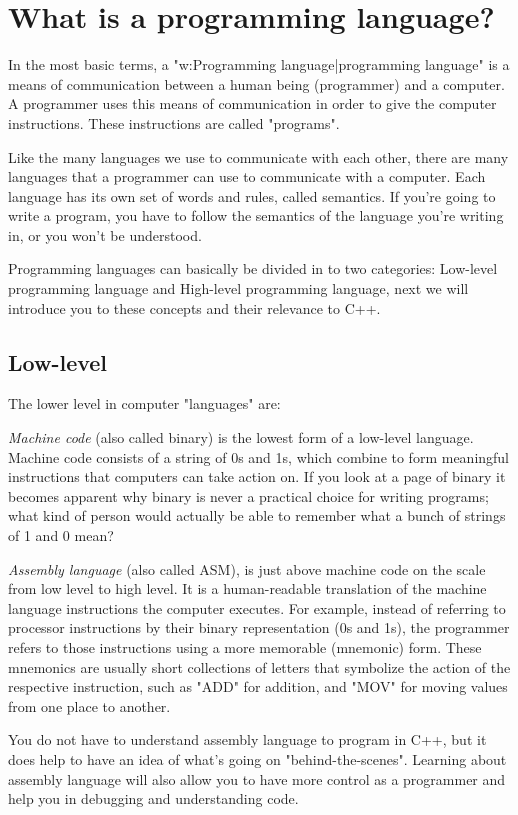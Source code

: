 \section{What is a programming language?}
In the most basic terms, a "w:Programming language|programming language" is a
means of communication between a human being (programmer) and a computer. A
programmer uses this means of communication in order to give the computer
instructions.  These instructions are called "programs".

Like the many languages we use to communicate with each other, there are many
languages that a programmer can use to communicate with a computer.  Each
language has its own set of words and rules, called semantics.  If you're going
to write a program, you have to follow the semantics of the language you're
writing in, or you won't be understood.

Programming languages can basically be divided in to two categories: Low-level
programming language and High-level programming language, next we will
introduce you to these concepts and their relevance to C++.

\subsection{Low-level}
The lower level in computer "languages" are: 

\textit{Machine code} (also called binary) is the lowest form of a low-level
language. Machine code consists of a string of 0s and 1s, which combine to form
meaningful instructions that computers can take action on. If you look at a
page of binary it becomes apparent why binary is never a practical choice for
writing programs; what kind of person would actually be able to remember what a
bunch of strings of 1 and 0 mean? 

\textit{Assembly language} (also called ASM), is just above machine code on
the scale from low level to high level. It is a human-readable translation of
the machine language instructions the computer executes.  For example, instead
of referring to processor instructions by their binary representation (0s and
1s), the programmer refers to those instructions using a more memorable
(mnemonic) form. These mnemonics are usually short collections of letters that
symbolize the action of the respective instruction, such as "ADD" for addition,
and "MOV" for moving values from one place to another.

You do not have to understand assembly language to program in C++, but it does
help to have an idea of what's going on "behind-the-scenes". Learning about
assembly language will also allow you to have more control as a programmer and
help you in debugging and understanding code.

